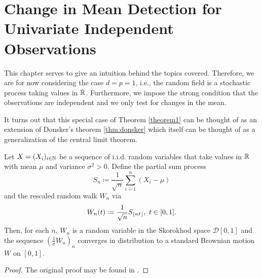 \chapter{Change in Mean Detection for Univariate Independent Observations}

\label{chapter:onedim}

This chapter serves to give an intuition behind the topics covered. Therefore, we are for now considering the case $d=p=1$, i.e., the random field is a stochastic process taking values in $\RR$. Furthermore, we impose the strong condition that the observations are independent and we only test for changes in the mean.

It turns out that this special case of Theorem \ref{theorem1} can be thought of as an extension of Donsker's theorem \ref{thm:donsker} which itself can be thought of as a generalization of the central limit theorem.

\begin{thm} \label{thm:donsker}
    Let $X = (X_i)_{i \in \NN}$ be a sequence of i.i.d. random variables that take values in $\RR$ with mean $\mu$ and variance $\sigma^2 > 0$. Define the partial sum process
    \[ S_n \coloneqq \frac{1}{\sqrt{n}} \sum_{i=1}^n (X_i - \mu) \]
    and the rescaled random walk $W_n$ via
    \[ W_n(t) \coloneqq \frac{1}{\sqrt{n}} S_{\floor*{nt}}, \ t \in [0, 1]. \]
    Then, for each $n$, $W_n$ is a random variable in the Skorokhod space $\mathcal{D}[0, 1]$ and the sequence $(\frac{1}{\sigma}W_n)_n$ converges in distribution to a standard Brownian motion $W$ on $[0, 1]$.
\end{thm}
\begin{proof}
    The original proof may be found in \cite{donsker1951invariance}.
\end{proof}




